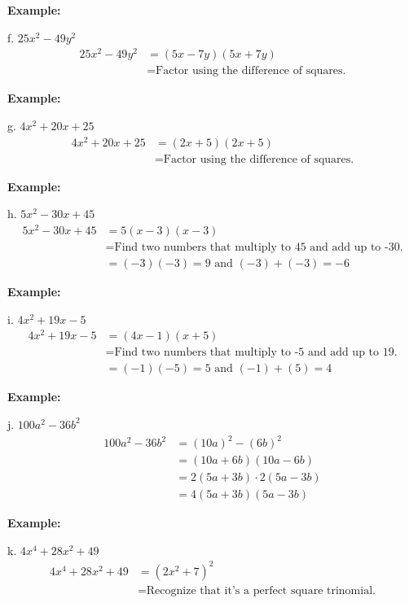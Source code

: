\documentclass[12pt,a4paper]{article}
\newenvironment{example}
  {\begin{framed}\colorbox{examplecolor}{
  \parbox{\dimexpr\linewidth-2\fboxsep}{
  \textbf{Example:}}}}
  {\end{framed}}
\begin{document}
\begin{example}
f. $25x^2 - 49y^2$
\begin{align*}
25x^2 - 49y^2 &= (5x - 7y)(5x + 7y) \\
&= \text{Factor using the difference of squares.}
\end{align*}
\end{example}

\begin{example}
g. $4x^2 + 20x + 25$
\begin{align*}
4x^2 + 20x + 25 &= (2x + 5)(2x + 5) \\
&= \text{Factor using the difference of squares.}
\end{align*}
\end{example}

\begin{example}
h. $5x^2 - 30x + 45$
\begin{align*}
5x^2 - 30x + 45 &= 5(x - 3)(x - 3) \\
&= \text{Find two numbers that multiply to 45 and add up to -30.} \\
&= (-3)(-3) = 9 \text{ and } (-3) + (-3) = -6
\end{align*}
\end{example}
\newpage 
\begin{example}
i. $4x^2 + 19x - 5$
\begin{align*}
4x^2 + 19x - 5 &= (4x - 1)(x + 5) \\
&= \text{Find two numbers that multiply to -5 and add up to 19.} \\
&= (-1)(-5) = 5 \text{ and } (-1) + (5) = 4
\end{align*}
\end{example}
\begin{example}
j. $100a^2 - 36b^2$
\begin{align*}
100a^2 - 36b^2 &= (10a)^2 - (6b)^2 \\
&= (10a + 6b)(10a - 6b) \\
&= 2(5a + 3b) \cdot 2(5a - 3b) \\
&= 4(5a + 3b)(5a - 3b)
\end{align*}
\end{example}

\begin{example}
k. $4x^4 + 28x^2 + 49$
\begin{align*}
4x^4 + 28x^2 + 49 &= (2x^2 + 7)^2 \\
&= \text{Recognize that it's a perfect square trinomial.}
\end{align*}
\end{example}
\end{document}
